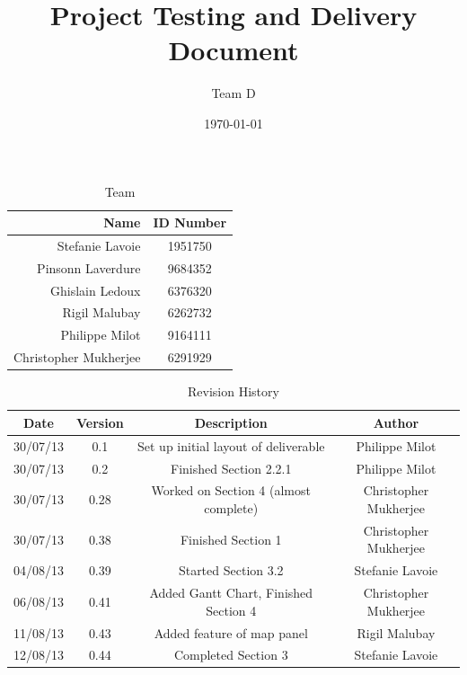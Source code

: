 \documentclass{article}
\begin{document}
\title{Project Testing and Delivery Document}
\author{Team D}
\date{\today}

\maketitle

\vspace*{3.5in}
\begin{table}[htbp]
\caption{Team}
\begin{center}
\begin{tabular}{|r | c|}
\hline
Name & ID Number \\
\hline\hline
Stefanie Lavoie & 1951750 \\
Pinsonn Laverdure & 9684352 \\
Ghislain Ledoux & 6376320 \\
Rigil Malubay & 6262732 \\
Philippe Milot & 9164111 \\
Christopher Mukherjee & 6291929 \\
\hline
\end{tabular}
\end{center}
\end{table}

\clearpage

\begin{table}[htbp]
\caption{Revision History}
\begin{center}
\begin{tabular}{|c | c | c | c| }
\hline
Date & Version & Description & Author \\
\hline\hline
30/07/13 & 0.1 & Set up initial layout of deliverable & Philippe Milot \\
\hline
30/07/13 & 0.2 & Finished Section 2.2.1 & Philippe Milot \\
\hline
30/07/13 & 0.28 & Worked on Section 4 (almost complete) & Christopher Mukherjee \\
\hline
30/07/13 & 0.38 & Finished Section 1 & Christopher Mukherjee \\
\hline
04/08/13 & 0.39 & Started Section 3.2 & Stefanie Lavoie \\
\hline
06/08/13 & 0.41 & Added Gantt Chart, Finished Section 4 & Christopher Mukherjee \\
\hline
11/08/13 & 0.43 & Added feature of map panel & Rigil Malubay \\
\hline
12/08/13 & 0.44 & Completed Section 3 & Stefanie Lavoie \\
\hline
\end{tabular}
\end{center}
\end{table}
\end{document}
